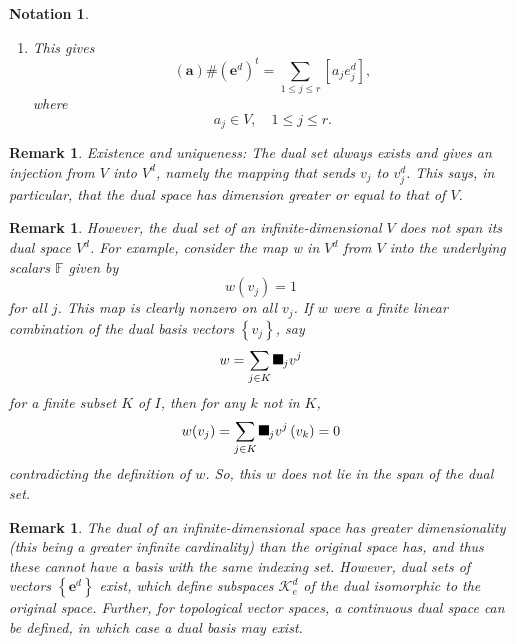 \documentclass[aps,preprint]{revtex4}%
\providecommand{\U}[1]{\protect\rule{.1in}{.1in}}
\newtheorem{definition}[theorem]{Definition}
\newtheorem{notation}[theorem]{Notation}
\newtheorem{remark}[theorem]{Remark}
\begin{document}
\begin{notation}
\begin{enumerate}
\begin{definition}
\end{definition}

\item This gives
\begin{equation}
\left(  \mathbf{a}\right)  \#\left(  \mathbf{e}^{d}\right)  ^{t}=\sum_{1\leq
j\leq r}\left[  a_{j}e_{j}^{d}\right]  ,
\end{equation}
where
\begin{equation}
a_{j}\in V,\quad1\leq j\leq r.
\end{equation}

\end{enumerate}
\end{notation}

\begin{remark}
Existence and uniqueness: The dual set always exists and gives an injection
from $V$ into $V^{d}$, namely the mapping that sends $v_{j}$ to $v_{j}^{d}$.
This says, in particular, that the dual space has dimension greater or equal
to that of $V$.
\end{remark}

\begin{remark}
However, the dual set of an infinite-dimensional $V$ does not span its dual
space $V^{d}$. For example, consider the map w in $V^{d}$ from $V$ into the
underlying scalars $\mathbb{F}$ given by
\begin{equation}
w(v_{j})=1
\end{equation}
for all $j$. This map is clearly nonzero on all $v_{j}$. If $w$ were a finite
linear combination of the dual basis vectors $\left\{  v_{j}\right\}  $, say
\begin{equation}
w=\sum_{j\in K}\U{3b1} _{j}v^{j}%
\end{equation}
for a finite subset $K$ of $I$, then for any $k$ not in $K$,
\begin{equation}
w(v_{j})=\sum_{j\in K}\U{3b1} _{j}v^{j}\left(  v_{k}\right)  =0
\end{equation}
contradicting the definition of $w$. So, this $w$ does not lie in the span of
the dual set.
\end{remark}

\begin{remark}
The dual of an infinite-dimensional space has greater dimensionality (this
being a greater infinite cardinality) than the original space has, and thus
these cannot have a basis with the same indexing set. However, dual sets of
vectors $\left\{  \mathbf{e}^{d}\right\}  $ exist, which define subspaces
$\mathcal{K}_{e}^{d}$ of the dual isomorphic to the original space. Further,
for topological vector spaces, a continuous dual space can be defined, in
which case a dual basis may exist.
\end{remark}
\end{document}
